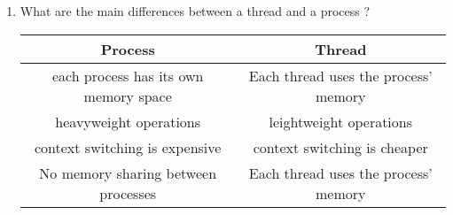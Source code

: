 \documentclass[11pt,a4paper]{article}
\begin{document}
\begin{exercise}
  $~$ %
\begin{enumerate}[label=(\alph*)]
	\item What are the main differences between a thread and a process ?

{\it
\begin{center}
\begin{tabular}{ |c|c| } 
 \hline
Process & Thread \\ 
\hline
each process has its own memory space & Each thread uses the process' memory\\
\hline
heavyweight operations & leightweight operations\\
\hline
context switching is expensive & context switching is cheaper\\
\hline
No memory sharing between processes & Each thread uses the process' memory\\
\hline
\end{tabular}
\end{center}
}
\end{enumerate}
\end{exercise}
\end{document}
